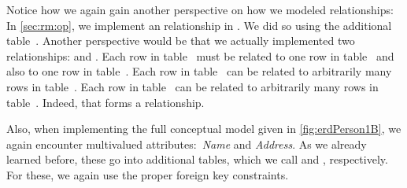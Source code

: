 Notice how we again gain another perspective on how we modeled relationships:
In \cref{sec:rm:op}, we implement an  relationship in \sql.
We did so using the additional table~.
Another perspective would be that we actually implemented two relationships:
 and .
Each row in table~ must be related to one row in table~ and also to one row in table~.
Each row in table~ can be related to arbitrarily many rows in table~.
Each row in table~ can be related to arbitrarily many rows in table~.
Indeed, that forms a  relationship.

Also, when implementing the full conceptual model given in \cref{fig:erdPerson1B}, we again encounter multivalued attributes:~\emph{Name} and \emph{Address}.
As we already learned before, these go into additional tables, which we call  and , respectively.
For these, we again use the proper foreign key  constraints.

